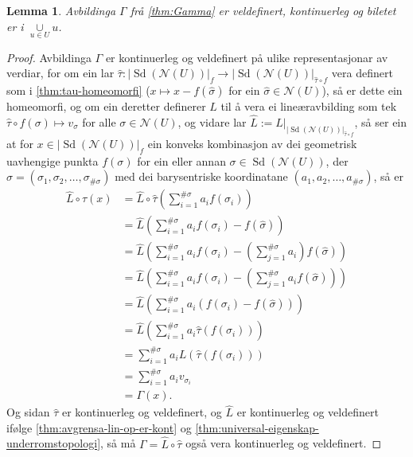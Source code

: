 \documentclass[a4paper, 12pt, norsk]{article}
\theoremstyle{plain}
\newtheorem{lemma}[theorem]{Lemma}
\theoremstyle{definition}
\newcommand{\Nc}{\mathcal{N}}
\newcommand{\union}{ \mathop{\cup}\limits }
\newcommand{\gr}[1]{ \lvert #1 \rvert } %
\newcommand{\tuple}[1]{ \left( #1 \right) } %
\DeclareMathOperator{\Sd}{Sd} %
\begin{document}
\begin{lemma} \label{thm:Gamma-eigenskapar}
	Avbildinga \( \Gamma \) frå \autoref{thm:Gamma} er veldefinert, kontinuerleg og biletet er i \( \union_{u\in U} u \).
\end{lemma}

\begin{proof}
	Avbildinga \( \Gamma \) er kontinuerleg og veldefinert på ulike representasjonar av verdiar, for om ein lar \( \hat{\tau} : \gr{\Sd(\Nc(U))}_f \to \gr{\Sd(\Nc(U))}_{\hat{\tau} \circ f} \) vera definert som i \autoref{thm:tau-homeomorfi} (\( x \mapsto x - f(\hat{\sigma}) \) for ein \( \hat{\sigma} \in \Nc(U) \)), så er dette ein homeomorfi, og om ein deretter definerer \( L \) til å vera ei lineæravbilding som tek \( \hat{\tau} \circ f (\sigma) \mapsto v_{\sigma} \) for alle \( \sigma \in \Nc(U) \), og vidare lar \( \hat{L} := L|_{\gr{\Sd(\Nc(U))}_{\hat{\tau}\circ f}} \), så ser ein at for \( x \in \gr{\Sd(\Nc(U))}_f \) ein konveks kombinasjon av dei geometrisk uavhengige punkta \( f(\sigma) \) for ein eller annan \( \sigma \in \Sd(\Nc(U)) \), der \( \sigma = \tuple{\sigma_1, \sigma_2, \dots, \sigma_{\#\sigma}} \) med dei barysentriske koordinatane \( \tuple{a_1, a_2, \dots, a_{\#\sigma}} \), så er
	\begin{align*}
		\hat{L} \circ \hat{\tau} (x) &= \hat{L} \circ \hat{\tau} \tuple{\sum_{i=1}^{\#\sigma}a_i f(\sigma_i)} \\
		&= \hat{L} \tuple{\sum_{i=1}^{\#\sigma}a_i f(\sigma_i)-f(\hat{\sigma})} \\
		&= \hat{L} \tuple{\sum_{i=1}^{\#\sigma}a_i f(\sigma_i)-\tuple{\sum_{j=1}^{\#\sigma}a_i}f(\hat{\sigma})} \\
		&= \hat{L} \tuple{\sum_{i=1}^{\#\sigma}a_i f(\sigma_i)-\tuple{\sum_{j=1}^{\#\sigma}a_if(\hat{\sigma})}} \\
		&= \hat{L} \tuple{\sum_{i=1}^{\#\sigma}a_i\tuple{f(\sigma_i)-f(\hat{\sigma})}} \\
		&= \hat{L} \tuple{\sum_{i=1}^{\#\sigma}a_i\hat{\tau}\tuple{f(\sigma_i)}} \\
		&= \sum_{i=1}^{\#\sigma}a_iL\tuple{\hat{\tau}\tuple{f(\sigma_i)}} \\
		&= \sum_{i=1}^{\#\sigma}a_i v_{\sigma_i} \\
		&= \Gamma(x).
	\end{align*}
	Og sidan \( \hat{\tau} \) er kontinuerleg og veldefinert, og \( \hat{L} \) er kontinuerleg og veldefinert ifølge \autoref{thm:avgrensa-lin-op-er-kont} og \autoref{thm:universal-eigenskap-underromstopologi}, så må \( \Gamma = \hat{L}\circ\hat{\tau} \) også vera kontinuerleg og veldefinert.


\end{proof}
\end{document}
